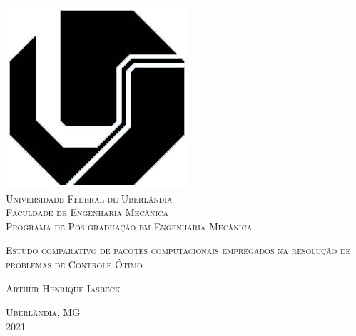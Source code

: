 
\begin{center}
	\Large

	\includegraphics[width=0.15\linewidth]{fig/pretextuais/ufu} \\
	\textsc{Universidade Federal de Uberlândia} \\
	\textsc{Faculdade de Engenharia Mecânica} \\
	\textsc{Programa de Pós-graduação em Engenharia Mecânica}

	\vspace{3.5cm}

	\textsc{\Huge Estudo comparativo de pacotes computacionais empregados na resolução de problemas de Controle Ótimo}

	\vspace{3.5cm}

	\textsc{Arthur Henrique Iasbeck}

	\vspace{3.5cm}

	\textsc{\large Uberlândia, MG \\ 2021}
\end{center}


\imprimirfolhaderosto*


\begin{fichacatalografica}
	\sffamily
	\vspace*{\fill}
	\begin{center}
	\end{center}
\end{fichacatalografica}

